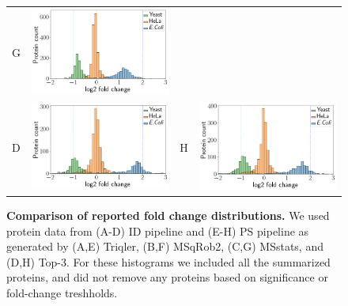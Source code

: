 \documentclass[11pt]{article}
\begin{document}
\begin{figure}[hbt]
\begin{tabular}{lclc}
        G & \includegraphics[width=0.4\linewidth]{../../result/report_plots_pipeline/histogram_PS_msstats.png} \\ 
        D & \includegraphics[width=0.4\linewidth]{../../result/report_plots_pipeline/histogram_ID_top3.png} &
        H & \includegraphics[width=0.4\linewidth]{../../result/report_plots_pipeline/histogram_PS_top3.png} 
    \end{tabular}
   
    \caption{{\bf Comparison of reported fold change distributions.} We used protein data from (A-D) ID pipeline and (E-H) PS pipeline as generated by 
    (A,E) Triqler, (B,F) MSqRob2, (C,G) MSstats, and (D,H) Top-3. For these histograms we included all the summarized proteins, and did not remove any proteins based on significance or fold-change treshholds.  \label{fig:fc_histogram_again}}
\end{figure}

\fi
\end{document}
